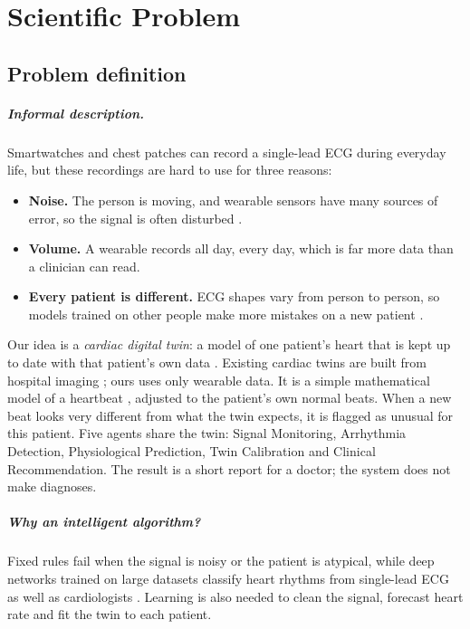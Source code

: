 \chapter{Scientific Problem}
\label{section:scientificProblem}

\section{Problem definition}
\label{section:problemDefinition}

\paragraph{Informal description.} Smartwatches and chest patches can record a single-lead ECG during everyday life, but these recordings are hard to use for three reasons:
\begin{itemize}
	\item \textbf{Noise.} The person is moving, and wearable sensors have many sources of error, so the signal is often disturbed \cite{bayoumy2021smart}.
	\item \textbf{Volume.} A wearable records all day, every day, which is far more data than a clinician can read.
	\item \textbf{Every patient is different.} ECG shapes vary from person to person, so models trained on other people make more mistakes on a new patient \cite{dechazal2004automatic,kiranyaz2016realtime}.
\end{itemize}

Our idea is a \emph{cardiac digital twin}: a model of one patient's heart that is kept up to date with that patient's own data \cite{corralacero2020digital}. Existing cardiac twins are built from hospital imaging \cite{gillette2021framework}; ours uses only wearable data. It is a simple mathematical model of a heartbeat \cite{mcsharry2003dynamical}, adjusted to the patient's own normal beats. When a new beat looks very different from what the twin expects, it is flagged as unusual for this patient. Five agents share the twin: Signal Monitoring, Arrhythmia Detection, Physiological Prediction, Twin Calibration and Clinical Recommendation. The result is a short report for a doctor; the system does not make diagnoses.

\paragraph{Why an intelligent algorithm?} Fixed rules fail when the signal is noisy or the patient is atypical, while deep networks trained on large datasets classify heart rhythms from single-lead ECG as well as cardiologists \cite{hannun2019cardiologist}. Learning is also needed to clean the signal, forecast heart rate and fit the twin to each patient.

